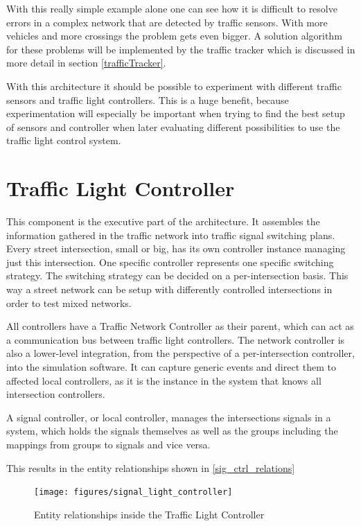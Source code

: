 With this really simple example alone one can see how it is difficult to resolve errors in a complex network that are detected by traffic sensors. With more vehicles and more crossings the problem gets even bigger. A solution algorithm for these problems will be implemented by the traffic tracker which is discussed in more detail in section \ref{trafficTracker}.

With this architecture it should be possible to experiment with different traffic sensors and traffic light controllers. This is a huge benefit, because experimentation will especially be important when trying to find the best setup of sensors and controller when later evaluating different possibilities to use the traffic light control system.

\section{Traffic Light Controller}
\label{trafficLightController}

This component is the executive part of the architecture. It assembles the information gathered in the traffic network into traffic signal switching plans. Every street intersection, small or big, has its own controller instance managing just this intersection. One specific controller represents one specific switching strategy. The switching strategy can be decided on a per-intersection basis. This way a street network can be setup with differently controlled intersections in order to test mixed networks.

All controllers have a Traffic Network Controller as their parent, which can act as a communication bus between traffic light controllers. The network controller is also a lower-level integration, from the perspective of a per-intersection controller, into the simulation software. It can capture generic events and direct them to affected local controllers, as it is the instance in the system that knows all intersection controllers.

A signal controller, or local controller, manages the intersections signals in a system, which holds the signals themselves as well as the groups including the mappings from groups to signals and vice versa.

This results in the entity relationships shown in \autoref{sig_ctrl_relations}

\begin{figure}[!ht]
	\centering
	\texttt{[image: figures/signal\_light\_controller]}
	\label{sig_ctrl_relations}
	\caption{Entity relationships inside the Traffic Light Controller}
\end{figure}

